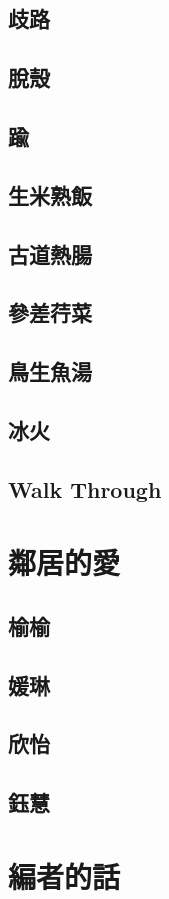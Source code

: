 \chapter{歧路}
\chapter{脫殼}
\chapter{踰}
\chapter{生米熟飯}
\chapter{古道熱腸}
\chapter{參差荇菜}
\chapter{鳥生魚湯}
\chapter{冰火}
\chapter{Walk Through}

\part{鄰居的愛}
\chapter{榆榆}
\chapter{媛琳}
\chapter{欣怡}
\chapter{鈺慧}

\part{編者的話}


